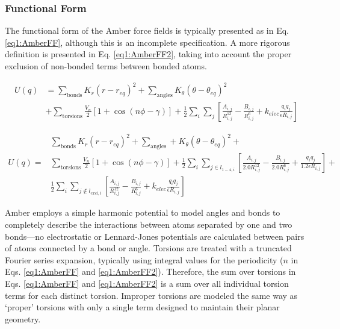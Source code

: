 \subsubsection{Functional Form}

The functional form of the Amber force fields is typically presented as in Eq.
\ref{eq1:AmberFF}, \cite{Cornell_JAmChemSoc_1995_v117_p5179} although this is an
incomplete specification. A more rigorous definition is presented in Eq.
\ref{eq1:AmberFF2}, taking into account the proper exclusion of non-bonded terms
between bonded atoms.

\begin{align}
   U(q) & = \sum _ {\text{bonds}} K_r ( r - r_{eq}) ^ 2 + \sum _ {\text{angles}}
          K_{\theta} ( \theta - \theta _ {eq} ) ^ 2 \nonumber \\
      & + \sum _ {\text{torsions}} \frac {V_n} 2 \left [ 1 + \cos (n \phi -
          \gamma) \right ] + \frac 1 2 \sum _ {i} \sum _ {j} \left [ \frac
          {A_{i,j}} {R_{i,j} ^ {12}} - \frac {B_{i,j}} {R_{i,j} ^ 6} + k_{elec}
          \frac {q_i q_j} {\epsilon R_{i, j}} \right ]
   \label{eq1:AmberFF}
\end{align}

\begin{align}
    & \sum _ {\text{bonds}} K_r ( r - r_{eq}) ^ 2 + \sum _ {\text{angles}} +
          K_{\theta} ( \theta - \theta _ {eq} ) ^ 2 \nonumber + \\
   U(q) = & \sum _ {\text{torsions}} \frac {V_n} 2 \left [ 1 + \cos (n \phi -
      \gamma) \right ] + \frac 1 2 \sum _ {i} \sum _ {j \in l_{1-4,i}} \left [
      \frac {A_{i,j}} {2.0 R_{i,j} ^ {12}} - \frac {B_{i,j}} {2.0 R_{i,j} ^ 6} +
      \frac {q_i q_j} {1.2 \epsilon R _{i,j}} \right ] +
      \label{eq1:AmberFF2} \\
    & \frac 1 2 \sum _ {i} \sum _ {j \notin l_{excl,i}} \left [ \frac {A_{i,j}}
      {R_{i,j} ^ {12}} - \frac {B_{i,j}} {R_{i,j} ^ 6} + k_{elec} \frac {q_i
      q_j} {\epsilon R_{i, j}} \right ] \nonumber
\end{align}

Amber employs a simple harmonic potential to model angles and bonds to
completely describe the interactions between atoms separated by one and two
bonds---\ie no electrostatic or Lennard-Jones potentials are calculated between
pairs of atoms connected by a bond or angle. Torsions are treated with a
truncated Fourier series expansion, typically using integral values for the
periodicity ($n$ in Eqs. \ref{eq1:AmberFF} and \ref{eq1:AmberFF2}). Therefore,
the sum over torsions in Eqs. \ref{eq1:AmberFF} and \ref{eq1:AmberFF2} is a sum
over all individual torsion terms for each distinct torsion. Improper torsions
are modeled the same way as `proper' torsions with only a single term designed
to maintain their planar geometry.

